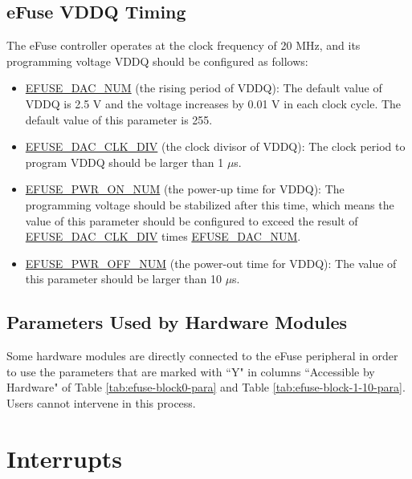 \documentclass[main\_\_EN.tex]{subfiles}
\begin{document}
\subsection{eFuse VDDQ Timing}
\label{sec:efuse-vddq-timing}

The eFuse controller operates at the clock frequency of 20 MHz, and its programming voltage VDDQ should be configured as follows:

\begin{itemize}
    \item \hyperref[fielddesc:EFUSEDACNUM]{EFUSE\_DAC\_NUM} (the rising period of VDDQ): The default value of VDDQ is 2.5 V and the voltage increases by 0.01 V in each clock cycle. The default value of this parameter is 255.
    \item \hyperref[fielddesc:EFUSEDACCLKDIV]{EFUSE\_DAC\_CLK\_DIV} (the clock divisor of VDDQ): The clock period to program VDDQ should be larger than 1 $\mu$s.
    \item \hyperref[fielddesc:EFUSEPWRONNUM]{EFUSE\_PWR\_ON\_NUM} (the power-up time for VDDQ): The programming voltage should be stabilized after this time, which means the value of this parameter should be configured to exceed the result of \hyperref[fielddesc:EFUSEDACCLKDIV]{EFUSE\_DAC\_CLK\_DIV} times \hyperref[fielddesc:EFUSEDACNUM]{EFUSE\_DAC\_NUM}.
    \item \hyperref[fielddesc:EFUSEPWROFFNUM]{EFUSE\_PWR\_OFF\_NUM} (the power-out time for VDDQ): The value of this parameter should be larger than 10 $\mu$s.
\end{itemize}



\subsection{Parameters Used by Hardware Modules}

Some hardware modules are directly connected to the eFuse peripheral in order to use the parameters that are marked with ``Y" in columns ``Accessible by Hardware" of Table \ref{tab:efuse-block0-para} and Table \ref{tab:efuse-block-1-10-para}. Users cannot intervene in this process.


\section{Interrupts}
\end{document}
